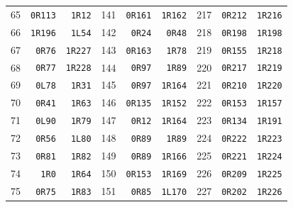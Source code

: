 {\begin{longtable}{rrr@{\hspace{8mm}}rrr@{\hspace{8mm}}rrr}
65 & \texttt{0R113} & \texttt{1R12} & 141 & \texttt{0R161} & \texttt{1R162} & 217 & \texttt{0R212} & \texttt{1R216}\\
66 & \texttt{1R196} & \texttt{1L54} & 142 & \texttt{0R24} & \texttt{0R48} & 218 & \texttt{0R198} & \texttt{1R198}\\
67 & \texttt{0R76} & \texttt{1R227} & 143 & \texttt{0R163} & \texttt{1R78} & 219 & \texttt{0R155} & \texttt{1R218}\\
68 & \texttt{0R77} & \texttt{1R228} & 144 & \texttt{0R97} & \texttt{1R89} & 220 & \texttt{0R217} & \texttt{1R219}\\
69 & \texttt{0L78} & \texttt{1R31} & 145 & \texttt{0R97} & \texttt{1R164} & 221 & \texttt{0R210} & \texttt{1R220}\\
70 & \texttt{0R41} & \texttt{1R63} & 146 & \texttt{0R135} & \texttt{1R152} & 222 & \texttt{0R153} & \texttt{1R157}\\
71 & \texttt{0L90} & \texttt{1R79} & 147 & \texttt{0R12} & \texttt{1R164} & 223 & \texttt{0R134} & \texttt{1R191}\\
72 & \texttt{0R56} & \texttt{1L80} & 148 & \texttt{0R89} & \texttt{1R89} & 224 & \texttt{0R222} & \texttt{1R223}\\
73 & \texttt{0R81} & \texttt{1R82} & 149 & \texttt{0R89} & \texttt{1R166} & 225 & \texttt{0R221} & \texttt{1R224}\\
74 & \texttt{1R0} & \texttt{1R64} & 150 & \texttt{0R153} & \texttt{1R169} & 226 & \texttt{0R209} & \texttt{1R225}\\
75 & \texttt{0R75} & \texttt{1R83} & 151 & \texttt{0R85} & \texttt{1L170} & 227 & \texttt{0R202} & \texttt{1R226}\\
\end{longtable}
}
